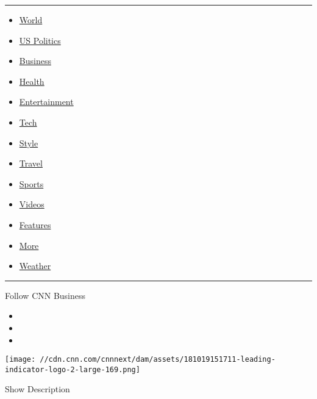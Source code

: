 \begin{center}\rule{0.5\linewidth}{\linethickness}\end{center}

\begin{itemize}
\tightlist
\item
  \href{/world}{World}
\item
  \href{/politics}{US Politics}
\item
  \href{/business}{Business}
\item
  \href{/health}{Health}
\item
  \href{/entertainment}{Entertainment}
\item
  \href{/business/tech}{Tech}
\item
  \href{/style}{Style}
\item
  \href{/travel}{Travel}
\item
  \href{/sport}{Sports}
\item
  \href{/videos}{Videos}
\item
  \href{/specials}{Features}
\item
  \href{/more}{More}
\item
  \href{/weather}{Weather}
\end{itemize}

\begin{center}\rule{0.5\linewidth}{\linethickness}\end{center}

Follow CNN Business

\begin{itemize}
\item
\item
\item
\end{itemize}

\texttt{[image: //cdn.cnn.com/cnnnext/dam/assets/181019151711-leading-indicator-logo-2-large-169.png]}

Show Description

